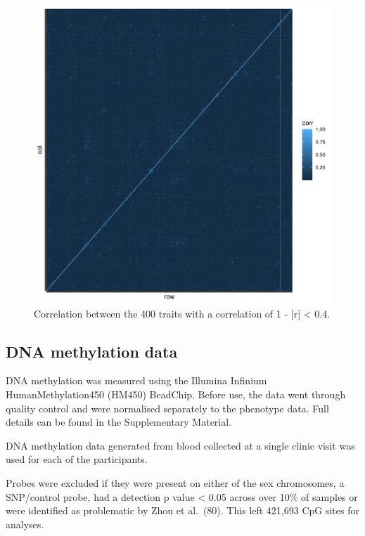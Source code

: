 \documentclass[11pt,oneside]{bristolthesis}
\begin{document}
\begin{figure}

{\centering \includegraphics[width=1\linewidth]{figure/05-h2ewas/test_correlation_plot} 

}

\caption{Correlation between the 400 traits with a correlation of 1 - {[}r{]} \textless{} 0.4.}\label{fig:h2ewas-pheno-corr-subset}
\end{figure}
\hypertarget{dna-methylation-data-05}{%
\subsection{DNA methylation data}\label{dna-methylation-data-05}}

DNA methylation was measured using the Illumina Infinium HumanMethylation450 (HM450) BeadChip. Before use, the data went through quality control and were normalised separately to the phenotype data. Full details can be found in the Supplementary Material.

DNA methylation data generated from blood collected at a single clinic visit was used for each of the participants.

Probes were excluded if they were present on either of the sex chromosomes, a SNP/control probe, had a detection p value \textless{} 0.05 across over 10\% of samples or were identified as problematic by Zhou et al.~(80). This left 421,693 CpG sites for analyses.
\end{document}
